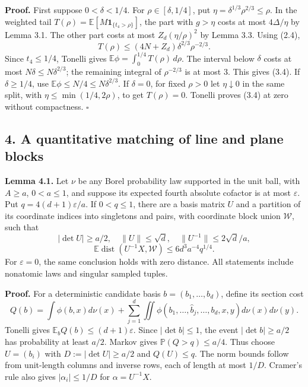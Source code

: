 \documentclass[
  11pt,
]{article}
\begin{document}
\textbf{Proof.} First suppose \(0<\delta<1/4\). For
\(\rho\in[\delta,1/4]\), put \(\eta=\delta^{1/3}\rho^{2/3}\le\rho\). In
the weighted tail \(T(\rho)=\mathbb E[M\mathbf1_{\{t_4>\rho\}}]\), the
part with \(g>\eta\) costs at most \(4\Delta/\eta\) by Lemma 3.1. The
other part costs at most \(Z_d(\eta/\rho)^2\) by Lemma 3.3. Using (2.4),
\[
 T(\rho)\le(4N+Z_d)\delta^{2/3}\rho^{-2/3}.
\] Since \(t_4\le1/4\), Tonelli gives
\(\mathbb E\phi=\int_0^{1/4}T(\rho)\,d\rho\). The interval below
\(\delta\) costs at most \(N\delta\le N\delta^{2/3}\); the remaining
integral of \(\rho^{-2/3}\) is at most 3. This gives (3.4). If
\(\delta\ge1/4\), use \(\mathbb E\phi\le N/4\le N\delta^{2/3}\). If
\(\delta=0\), for fixed \(\rho>0\) let \(\eta\downarrow0\) in the same
split, with \(\eta\le\min(1/4,2\rho)\), to get \(T(\rho)=0\). Tonelli
proves (3.4) at zero without compactness. \(\square\)

\subsection{4. A quantitative matching of line and plane
blocks}\label{a-quantitative-matching-of-line-and-plane-blocks}

\textbf{Lemma 4.1.} Let \(\nu\) be any Borel probability law supported
in the unit ball, with \(A\ge a\), \(0<a\le1\), and suppose its expected
fourth absolute cofactor is at most \(\varepsilon\). Put
\(q=4(d+1)\varepsilon/a\). If \(0<q\le1\), there are a basis matrix
\(U\) and a partition of its coordinate indices into singletons and
pairs, with coordinate block union \(\mathcal W\), such that \[
 |\det U|\ge a/2,\quad \|U\|\le\sqrt d,\quad
 \|U^{-1}\|\le2\sqrt d/a,
\] \[
 \mathbb E\operatorname{dist}(U^{-1}X,\mathcal W)
 \le6d^3a^{-4}q^{1/4}.                                       \tag{4.1}
\] For \(\varepsilon=0\), the same conclusion holds with zero distance.
All statements include nonatomic laws and singular sampled tuples.

\textbf{Proof.} For a deterministic candidate basis
\(b=(b_1,\ldots,b_d)\), define its section cost \[
 Q(b)=\int\phi(b,x)d\nu(x)
 +\sum_{j=1}^d\iint\phi(b_1,\ldots,\widehat b_j,\ldots,b_d,x,y)
                         d\nu(x)d\nu(y).
\] Tonelli gives \(\mathbb E_bQ(b)\le(d+1)\varepsilon\). Since
\(|\det b|\le1\), the event \(|\det b|\ge a/2\) has probability at least
\(a/2\). Markov gives \(\mathbb P(Q>q)\le a/4\). Thus choose \(U=(b_i)\)
with \(D:=|\det U|\ge a/2\) and \(Q(U)\le q\). The norm bounds follow
from unit-length columns and inverse rows, each of length at most
\(1/D\). Cramer's rule also gives \(|\alpha_i|\le1/D\) for
\(\alpha=U^{-1}X\).
\end{document}
